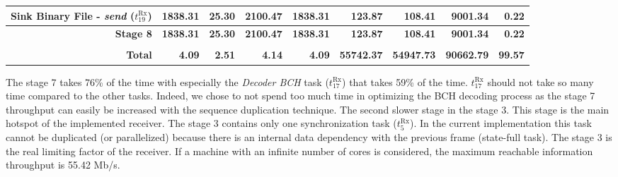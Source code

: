 \begin{table}[htp]
{{\begin{tabular}{r | r r r r  | r r r | r}
    \rowcolor{Paired-7!15}
                 Sink Binary File -          \emph{send} ($t^\text{Rx}_{19}$) &         1838.31  &            25.30  &          2100.47  &                                1838.31  &           123.87  &           108.41  &          9001.34  &          0.22  \\ \hline
                                                             \textbf{Stage 8} & \textbf{1838.31} &    \textbf{25.30} &  \textbf{2100.47} &                        \textbf{1838.31} &   \textbf{123.87} &   \textbf{108.41} &  \textbf{9001.34} &  \textbf{0.22} \\ %
                                                                              &                  &                   &                   &                                         &                   &                   &                   &                \\ \hline \hline
                                                               \textbf{Total} &    \textbf{4.09} &     \textbf{2.51} &     \textbf{4.14} &                           \textbf{4.09} & \textbf{55742.37} & \textbf{54947.73} & \textbf{90662.79} & \textbf{99.57} \\ %
  \end{tabular}
  }}
\end{table}

The stage 7 takes 76\% of the time with especially the \emph{Decoder BCH} task
($t^\text{Rx}_{17}$) that takes 59\% of the time. $t^\text{Rx}_{17}$ should not
take so many time compared to the other tasks. Indeed, we chose to not spend
too much time in optimizing the BCH decoding process as the stage 7 throughput
can easily be increased with the sequence duplication technique. The second
slower stage in the stage 3. This stage is the main hotspot of the implemented
receiver. The stage 3 contains only one synchronization task
($t^\text{Rx}_{5}$). In the current implementation this task cannot be
duplicated (or parallelized) because there is an internal data dependency with
the previous frame (state-full task). The stage 3 is the real limiting factor of
the receiver. If a machine with an infinite number of cores is considered, the
maximum reachable information throughput is 55.42 Mb/s.

